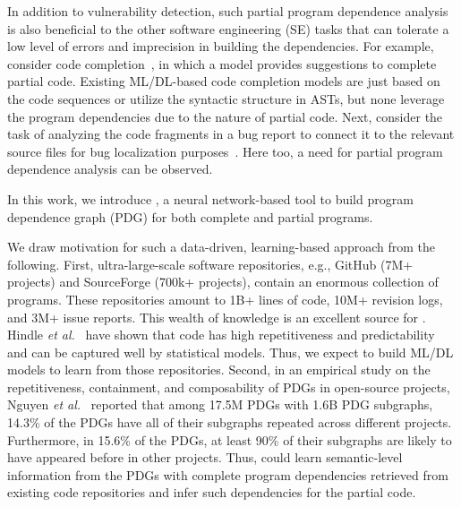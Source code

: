 In addition to vulnerability detection, such partial program dependence analysis is also beneficial to the other software engineering (SE) tasks that can tolerate a low level of errors and imprecision in building the dependencies. For example, consider code completion~\cite{codefill-icse22,facebook-icse21}, in which a model provides suggestions to complete partial code. Existing ML/DL-based code completion models are just based on the code sequences or utilize the syntactic structure in ASTs, but none leverage the program dependencies due to the nature of partial code. Next, consider the task of analyzing the code fragments in a bug report to connect it to the relevant source files for bug localization purposes~\cite{euler-fse19,icpc17}. Here too, a need for partial program dependence analysis can be observed.

In this work, we introduce \tool, a neural network-based tool to build
program dependence graph (PDG) for both complete and partial
programs. 

We draw motivation for such a data-driven, learning-based approach
from the following. First, ultra-large-scale software repositories,
e.g., GitHub (7M+ projects) and SourceForge (700k+ projects), contain
an enormous collection of programs. These repositories amount to 1B+
lines of code, 10M+ revision logs, and 3M+ issue reports. This wealth
of knowledge is an excellent source for {\tool}. Hindle {\em et
  al.}~\cite{naturalness-icse12} have shown that code has high
repetitiveness and predictability and can be captured well by
statistical models. Thus, we expect to build ML/DL models to learn
from those repositories.
Second, in an empirical study on the repetitiveness, containment, and
composability of PDGs in open-source projects, Nguyen {\em et
  al.}~\cite{msr16} reported that among 17.5M PDGs with 1.6B PDG
subgraphs, 14.3\% of the PDGs have all of their subgraphs repeated
across different projects. Furthermore, in 15.6\% of the PDGs, at
least 90\% of their subgraphs are likely to have appeared before in
other projects.
Thus, {\tool} could learn semantic-level information from the PDGs
with complete program dependencies retrieved from existing code
repositories and infer such dependencies for the partial code.

